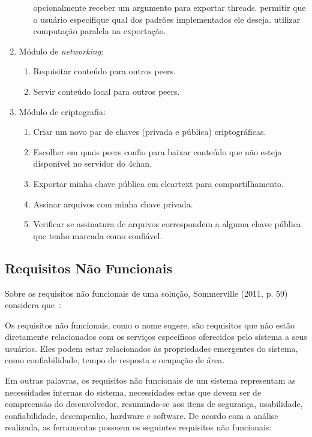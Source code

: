 \begin{enumerate}
\begin{enumerate}[label*=\arabic*.]
            \subitem opcionalmente receber um argumento para exportar threads.
            \subitem permitir que o usuário especifique qual dos padrões implementados ele deseja.
            \subitem utilizar computação paralela na exportação.
    \end{enumerate}
    \item Módulo de \textit{networking}:
    \begin{enumerate}[label*=\arabic*.]
        \item Requisitar conteúdo para outros peers.
        \item Servir conteúdo local para outros peers.
    \end{enumerate}
    \item Módulo de criptografia:
    \begin{enumerate}[label*=\arabic*.]
        \item Criar um novo par de chaves (privada e pública) criptográficas.
        \item Escolher em quais peers confio para baixar conteúdo que não esteja disponível no servidor do 4chan.
        \item Exportar minha chave pública em cleartext para compartilhamento.
        \item Assinar arquivos com minha chave privada.
        \item Verificar se assinatura de arquivos correspondem a alguma chave pública que tenho marcada como confiável.
    \end{enumerate}
\end{enumerate}

\subsection{Requisitos Não Funcionais}

Sobre os requisitos não funcionais de uma solução, Sommerville (2011, p. 59) considera que~\cite{SOMMERVILLE1}:

\begin{directcite}
Os requisitos não funcionais, como o nome sugere, são requisitos
que não estão diretamente relacionados com os serviços específicos
oferecidos pelo sistema a seus usuários.
Eles podem estar
relacionados às propriedades emergentes do sistema, como
confiabilidade, tempo de resposta e ocupação de área.
\end{directcite}

Em outras palavras, os requisitos não funcionais de um sistema representam as necessidades internas do sistema, necessidades estas que devem ser de compreensão do desenvolvedor, resumindo-se aos itens de segurança, usabilidade, confiabilidade, desempenho, hardware e software.
De acordo com a análise realizada, as ferramentas possuem os seguintes requisitos não funcionais:

